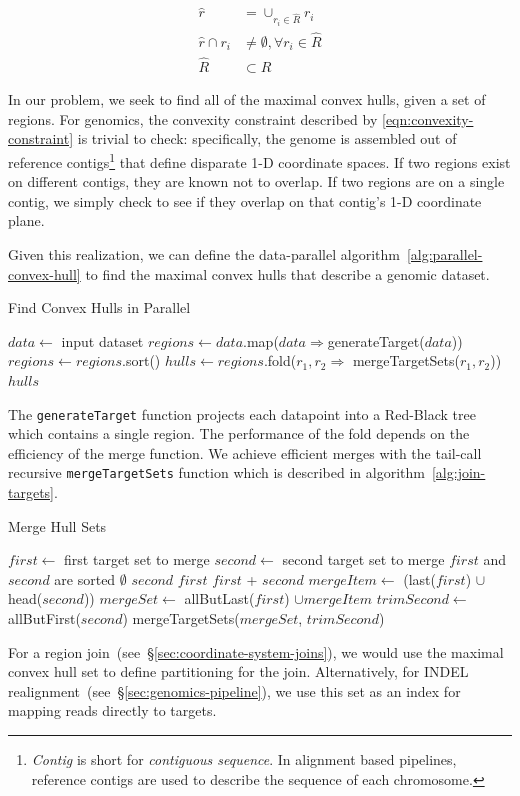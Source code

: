\documentclass{acm_proc_article-sp}
\begin{document}
\begin{align}
\label{eqn:convexity-constraint}
\hat{r} &= \cup_{r_i \in \hat{R}} r_i \\
\hat{r} \cap r_i &\ne \emptyset, \forall r_i \in \hat{R} \\
\hat{R} &\subset R
\end{align}

In our problem, we seek to find all of the maximal convex hulls, given a set of regions. For genomics, the
convexity constraint described by \eqref{eqn:convexity-constraint} is trivial to check: specifically, the
genome is assembled out of reference contigs\footnote{\emph{Contig} is short for \emph{contiguous
sequence}. In alignment based pipelines, reference contigs are  used to describe the sequence of each
chromosome.} that define disparate 1-D coordinate spaces. If two regions exist on different contigs, they
are known not to overlap. If two regions are on a single contig, we simply check to see if they overlap
on that contig's 1-D coordinate plane.

Given this realization, we can define the data-parallel algorithm~\ref{alg:parallel-convex-hull} to find the
maximal convex hulls that describe a genomic dataset.

\begin{algorithm}
\caption{Find Convex Hulls in Parallel}
\label{alg:parallel-convex-hull}
\begin{algorithmic}
\STATE $data \leftarrow$ input dataset
\STATE $regions \leftarrow data$.map($data \Rightarrow $generateTarget($data$))
\STATE $regions \leftarrow regions$.sort()
\STATE $hulls \leftarrow regions$.fold($r_1, r_2 \Rightarrow$ mergeTargetSets($r_1, r_2$))
\RETURN $hulls$
\end{algorithmic}
\end{algorithm}

The \texttt{generateTarget} function projects each datapoint into a Red-Black tree which contains a
single region. The performance of the fold depends on the efficiency of the merge function. We achieve
efficient merges with the tail-call recursive \texttt{mergeTargetSets} function which is described in
algorithm~\ref{alg:join-targets}.

\begin{algorithm}
\caption{Merge Hull Sets}
\label{alg:join-targets}
\begin{algorithmic}
\STATE $first \leftarrow$ first target set to merge
\STATE $second \leftarrow$ second target set to merge
\REQUIRE $first$ and $second$ are sorted
\RETURN $\emptyset$
\RETURN $second$
\RETURN $first$
\ELSE
{}
\RETURN $first$ + $second$
\ELSE
\STATE $mergeItem \leftarrow$ (last($first$) $\cup$ head($second$))
\STATE $mergeSet \leftarrow$ allButLast($first$) $\cup mergeItem$
\STATE $trimSecond \leftarrow$ allButFirst($second$)
\RETURN mergeTargetSets($mergeSet$, $trimSecond$)
\ENDIF
\ENDIF
\end{algorithmic}
\end{algorithm}

For a region join~(see~\S\ref{sec:coordinate-system-joins}), we would use the maximal convex hull
set to define partitioning for the join. Alternatively, for INDEL
realignment~(see~\S\ref{sec:genomics-pipeline}), we use this set as an index for mapping reads directly
to targets.

\balance
\end{document}
